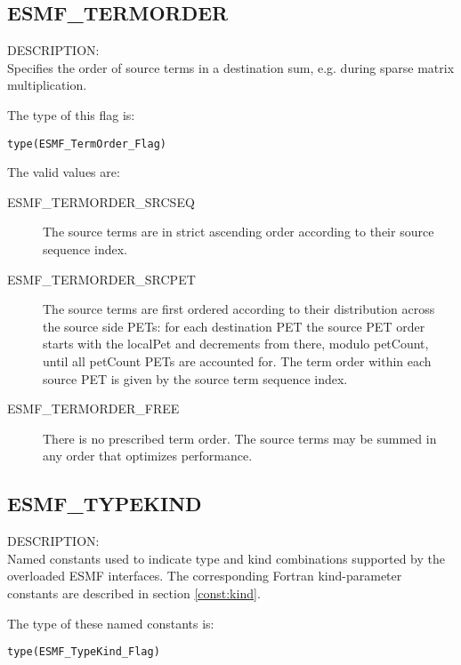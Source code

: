 \subsection{ESMF\_TERMORDER}
\label{const:termorderflag}
{\sf DESCRIPTION:\\}  
Specifies the order of source terms in a destination sum, e.g. during sparse
matrix multiplication.

The type of this flag is:

{\tt type(ESMF\_TermOrder\_Flag)}

The valid values are:
\begin{description}

\item [ESMF\_TERMORDER\_SRCSEQ]
         The source terms are in strict ascending order according to
         their source sequence index.
\item [ESMF\_TERMORDER\_SRCPET]
         The source terms are first ordered according to their distribution
         across the source side PETs: for each destination PET the source PET
         order starts with the localPet and decrements from there, modulo
         petCount, until all petCount PETs are accounted for. The term order
         within each source PET is given by the source term sequence index.
\item [ESMF\_TERMORDER\_FREE]
         There is no prescribed term order. The source terms may be summed in 
         any order that optimizes performance.
\end{description}


\subsection{ESMF\_TYPEKIND}
\label{const:typekind}

{\sf DESCRIPTION:\\}
Named constants used to indicate type and kind combinations supported by the
overloaded ESMF interfaces. The corresponding Fortran kind-parameter constants
are described in section \ref{const:kind}.

The type of these named constants is:

{\tt type(ESMF\_TypeKind\_Flag)}

